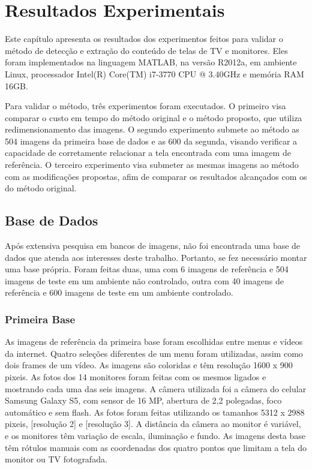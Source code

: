 \chapter{Resultados Experimentais}

Este capítulo apresenta os resultados dos experimentos feitos para validar o método de detecção e extração do conteúdo de telas de TV e monitores. Eles foram implementados na linguagem MATLAB, na versão R2012a, em ambiente Linux, processador Intel(R) Core(TM) i7-3770 CPU @ 3.40GHz e memória RAM 16GB.

Para validar o método, três experimentos foram executados. O primeiro visa comparar o custo em tempo do método original e o método proposto, que utiliza redimensionamento das imagens. O segundo experimento submete ao método as 504 imagens da primeira base de dados e as 600 da segunda, visando verificar a capacidade de corretamente relacionar a tela encontrada com uma imagem de referência. O terceiro experimento visa submeter as mesmas imagens ao método com as modificações propostas, afim de comparar os resultados alcançados com os do método original.


\section{Base de Dados}

Após extensiva pesquisa em bancos de imagens, não foi encontrada uma base de dados que atenda aos interesses deste trabalho.
 Portanto, se fez necessário montar uma base própria. Foram feitas duas, uma com 6 imagens de referência e 504 imagens de teste em um ambiente não controlado, outra com 40 imagens de referência e 600 imagens de teste em um ambiente controlado.

\subsection{Primeira Base}

As imagens de referência da primeira base foram escolhidas entre menus e vídeos da internet. Quatro seleções diferentes de um menu foram utilizadas, assim como dois frames de um vídeo. As imagens são coloridas e têm resolução 1600 x 900 pixeis. As fotos dos 14 monitores foram feitas com os mesmos ligados e mostrando cada uma das seis imagens. A câmera utilizada foi a câmera do celular Samsung Galaxy S5, com sensor de 16 MP, abertura de 2,2 polegadas, foco automático e sem flash. As fotos foram feitas utilizando os tamanhos 5312 x 2988 pixeis, [resolução 2] e [resolução 3]. A distância da câmera ao monitor é variável, e os monitores têm variação de escala, iluminação e fundo. As imagens desta base têm rótulos manuais com as coordenadas dos quatro pontos que limitam a tela do monitor ou TV fotografada.

